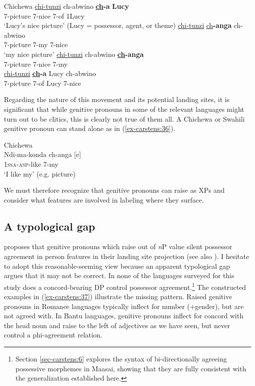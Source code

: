 \documentclass[output=paper
,modfonts
,nonflat]{langsci/langscibook}
\begin{document}
\begin{exe}
	\ex  Chichewa \label{ex-carstens:35}
	\xlist
	\ex
	\gll \uline{chi}\uline{-tunzi}     ch-abwino     \textbf{\uline{ch}-a}   \textbf{Lucy}\\
	7-picture   7-nice         7-of   1Lucy\\
	\glt `Lucy's nice picture'  (Lucy = possessor, agent, or theme) 	
	\ex 
	\gll \uline{chi}\uline{-tunzi}      \uline{ch}\textbf{-anga}     ch-abwino\\
	7-picture   7-my         7-nice\\
	\glt `my nice picture'
	\ex
	\gll  *\uline{chi}\uline{-tunzi}    ch-abwino     \textbf{\uline{ch}-anga}\\
	7-picture   7-nice      7-my\\
	\ex
	\gll  *\uline{chi}\uline{-tunzi}    \textbf{\uline{ch}-a} Lucy     ch-abwino\\
	7-picture   7-of   Lucy   7-nice\\
	\endxlist
\end{exe}
Regarding the nature of this movement and its potential landing sites, it is significant that while genitive pronouns in some of the relevant languages might turn out to be clitics, this is clearly not true of them all. A Chichewa or Swahili genitive pronoun can stand alone as in (\ref{ex-carstens:36}).

\begin{exe}
\ex Chichewa \citep[295]{Carstens1997}\label{ex-carstens:36}\\
\gll Ndi-ma-konda  ch-anga [e]\\
1\textsc{ssa}-\textsc{asp}-like     7-my\\
\glt *`I like my' (e.g. picture)
\end{exe}
We must therefore recognize that genitive pronouns can raise as XPs and consider what features are involved in labeling where they surface. 

\subsection{A typological gap} \label{sec-carstens:5.2}
\citet{Giusti2008} proposes that genitive pronouns which raise out of \textit{n}P value silent possessor agreement in person features in their landing site projection (see also \citealt{Sichel2002}). I hesitate to adopt this reasonable-seeming view because an apparent typological gap argues that it may not be correct. In none of the languages surveyed for this study does a concord-bearing DP control possessor agreement.\footnote{Section \ref{sec-carstens:6} explores the syntax of bi-directionally agreeing possessive morphemes in Maasai, showing that they are fully consistent with the generalization established here.} The constructed examples in (\ref{ex-carstens:37}) illustrate the missing pattern. Raised genitive pronouns in Romance languages typically inflect for number (+gender), but are not agreed with. In Bantu languages, genitive pronouns inflect for concord with the head noun and raise to the left of adjectives as we have seen, but never control a phi-agreement relation. 
\end{document}
